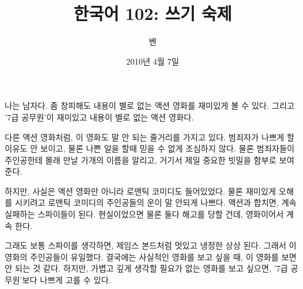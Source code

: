 \documentclass[12pt]{article}
\title{한국어 102: 쓰기 숙제}
\author{벤}
\date{2010년 4월 7일}
\begin{document}
\maketitle
\thispagestyle{empty}
\pagestyle{empty}
\doublespacing

나는 남자다. 좀 창피해도 내용이 별로 없는 액션 영화를 재미있게 볼 수 있다.
그리고 '7급 공무원'이 재미있고 내용이 별로 없는 액션 영화다.

다른 액션 영화처럼, 이 영화도 말 안 되는 줄거리를 가지고 있다.  범죄자가 나쁘게
할 이유도 안 보이고, 물론 나쁜 일을 할때 믿을 수 없게 조심하지 않다.  물론
범죄자들이 주인공한테 몰래 만날 가개의 이름을 알리고, 거기서 제일 중요한 빗밀을
함부로 보여준다.

하지만, 사실은 액션 영화만 아니라 로맨틱 코미디도 들어있었다.  물론 재미있게
오해를 시키려고 로맨틱 코미디의 주인공들의 운이 말 안되게 나쁘다.  액션과
합치면, 계속 실패하는 스파이들이 된다.  현실이었으면 물론 둘다 해고를 당할
건데, 영화이어서 계속 한다.

그래도 보통 스파이를 생각하면, 제임스 본드처럼 멋있고 냉정한 상상 된다.  그래서
이 영화의 주인공들이 유일했다.  결국에는 사실적인 영화를 보고 싶을 때, 이
영화를 보면 안 되는 것 같다.  하지만, 가볍고 깊게 생각할 필요가 없는 영화를
보고 싶으면, '7급 공무원'보다 나쁘게 고를 수 있다.
\end{document}
